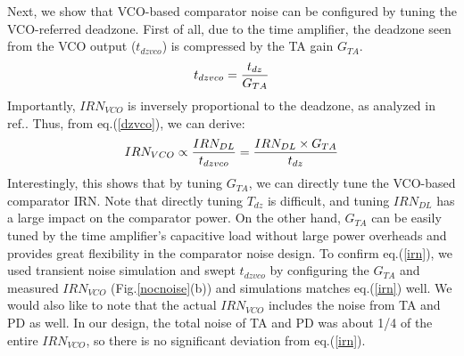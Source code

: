 \documentclass[journal]{IEEEtran}
\begin{document}

Next, we show that VCO-based comparator noise can be configured by tuning the VCO-referred deadzone.
First of all, due to the time amplifier, the deadzone seen from the VCO output ($t_{dzvco}$) is compressed by the TA gain $G_{TA}$.
\begin{eqnarray}
    \centering
    t_{dzvco} = \frac{t_{dz}}{G_{TA}}
    \label{dzvco}
\end{eqnarray}
Importantly, $IRN_{VCO}$ is inversely proportional to the deadzone, as analyzed in ref.\cite{luo2020input, ding20190}. Thus, from eq.(\ref{dzvco}), we can derive:
\begin{eqnarray}
    \centering
    IRN_{VCO} \propto \frac{IRN_{DL}}{t_{dzvco}} = \frac{IRN_{DL}\times G_{TA}}{t_{dz}}
    \label{irn}
\end{eqnarray}
Interestingly, this shows that by tuning $G_{TA}$, we can directly tune the VCO-based comparator IRN. Note that directly tuning $T_{dz}$ is difficult, and tuning $IRN_{DL}$ has a large impact on the comparator power. On the other hand, $G_{TA}$ can be easily tuned by the time amplifier's capacitive load without large power overheads and provides great flexibility in the comparator noise design. To confirm eq.(\ref{irn}), we used transient noise simulation and swept $t_{dzvco}$ by configuring the $G_{TA}$ and measured $IRN_{VCO}$ (Fig.\ref{nocnoise}(b)) and simulations  matches eq.(\ref{irn}) well. We would also like to note that the actual $IRN_{VCO}$ includes the noise from TA and PD as well. In our design, the total noise of TA and PD was about 1/4 of the entire $IRN_{VCO}$, so there is no significant deviation from eq.(\ref{irn}).
\end{document}
